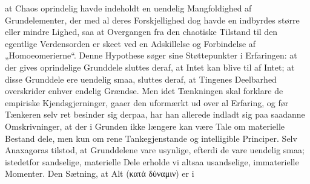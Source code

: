 \documentclass[12pt]{book}
\newcommand{\opage}[1]{\marginnote{\footnotesize\textit{[#1]}}}
\begin{document}
at Chaos oprindelig havde indeholdt en uendelig Mangfoldighed af Grundelementer, der med al
deres Forskjellighed dog havde en indbyrdes større eller mindre Lighed, saa at Overgangen fra
den chaotiske Tilstand til den egentlige Verdensorden er skeet ved en Adskillelse og Forbindelse
af „Homoeomerierne“. Denne Hypothese søger sine Støttepunkter i Erfaringen: at der gives
oprindelige Grunddele sluttes deraf, at Intet kan blive til af Intet; at disse Grunddele ere
uendelig smaa, sluttes deraf, at Tingenes Deelbarhed overskrider enhver endelig Grændse. Men
idet Tænkningen skal forklare de empiriske Kjendsgjerninger, gaaer den uformærkt ud over al
Erfaring, og før Tænkeren selv ret besinder sig derpaa, har han allerede indladt sig paa
saadanne Omskrivninger, at der i Grunden ikke længere kan være Tale om materielle Bestand%
\opage{140}%
dele, men kun om rene Tankegjenstande og intelligible Principer. Selv Anaxagoras tilstod, at
Grunddelene vare usynlige, efterdi de vare uendelig smaa; istedetfor sandselige, materielle Dele
erholde vi altsaa usandselige, immaterielle Momenter. Den Sætning, at Alt (κατὰ δύναμιν) er i
\end{document}

